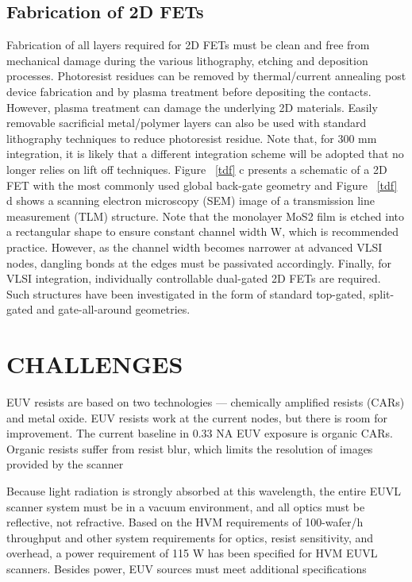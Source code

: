 \documentclass[12pt,a4paper]{report}
\begin{document}
\begin{itemize}
\section{Fabrication of 2D FETs}
Fabrication of all layers required for 2D FETs must be clean and free from 
mechanical damage during the various lithography, etching and deposition 
processes. Photoresist residues can be removed by thermal/current annealing 
post device fabrication and by plasma treatment before depositing the contacts. 
However, plasma treatment can damage the underlying 2D materials. Easily removable 
sacrificial metal/polymer layers can also be used with standard lithography 
techniques to reduce photoresist residue. Note that, for 300 mm integration, 
it is likely that a different integration scheme will be adopted that no longer 
relies on lift off techniques. Figure ~\ref{tdf} c presents a schematic of a 2D FET with 
the most commonly used global back-gate geometry and Figure ~\ref{tdf} d shows a scanning 
electron microscopy (SEM) image of a transmission line measurement (TLM) structure. 
Note that the monolayer MoS2 film is etched into a rectangular shape to 
ensure constant channel width W, which is recommended practice. However, 
as the channel width becomes narrower at advanced VLSI nodes, dangling bonds 
at the edges must be passivated accordingly. Finally, for VLSI integration,
individually controllable dual-gated 2D FETs are required. Such structures 
have been investigated in the form of standard top-gated, split-gated and 
gate-all-around geometries.


 
\chapter{CHALLENGES}

EUV resists are based on two technologies — chemically amplified 
resists (CARs) and metal oxide. EUV resists work at the current 
nodes, but there is room for improvement.
The current baseline in 0.33 NA EUV exposure is organic CARs. 
Organic resists suffer from resist blur, which limits the 
resolution of images provided by the scanner


Because light radiation is strongly
absorbed at this wavelength, the entire EUVL scanner system must be in a vacuum
environment, and all optics must be reflective, not refractive. Based on the HVM
requirements of 100-wafer/h throughput and other system requirements for optics,
resist sensitivity, and overhead, a power requirement of 115 W has been
specified for HVM EUVL scanners. Besides power, EUV sources must meet additional specifications


\end{itemize}
\end{document}
